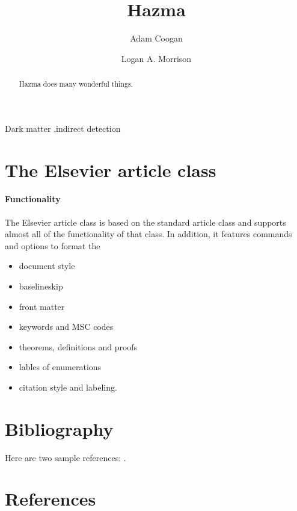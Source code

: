 \documentclass[review]{elsarticle}
\begin{document}
\begin{frontmatter}

\title{Hazma}

\author[grappa,ucsc,scipp]{Adam Coogan}

\author[ucsc,scipp]{Logan A. Morrison}

\address[grappa]{GRAPPA, Institute of Physics, University of Amsterdam, 1098 XH Amsterdam, The Netherlands}
\address[ucsc]{Department of Physics, 1156 High St., University of California Santa Cruz, Santa Cruz, CA 95064, USA}
\address[scipp]{Santa Cruz Institute for Particle Physics, 1156 High St., Santa Cruz, CA 95064, USA}

\begin{abstract}
    Hazma does many wonderful things.
\end{abstract}

\begin{keyword}
Dark matter \sep indirect detection
\end{keyword}

\end{frontmatter}

\linenumbers

\section{The Elsevier article class}

\paragraph{Functionality} The Elsevier article class is based on the standard article class and supports almost all of the functionality of that class. In addition, it features commands and options to format the
\begin{itemize}
\item document style
\item baselineskip
\item front matter
\item keywords and MSC codes
\item theorems, definitions and proofs
\item lables of enumerations
\item citation style and labeling.
\end{itemize}

\section{Bibliography}

Here are two sample references: \cite{Feynman1963118,Dirac1953888}.

\section*{References}


\end{document}
